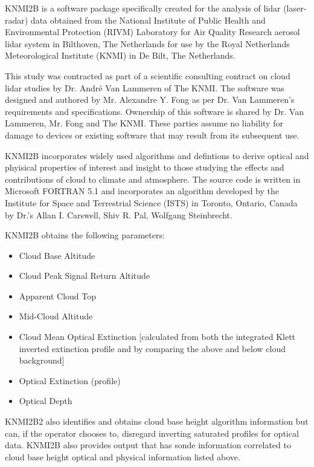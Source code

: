 KNMI2B  is  a software package specifically created for 
the analysis of lidar (laser-radar) data obtained from the National 
Institute of Public Health and Environmental Protection (RIVM)
Laboratory for Air Quality Research aerosol lidar system in 
Bilthoven, The Netherlands for use by the 
Royal Netherlands Meteorological Institute (KNMI) in De Bilt, The Netherlands. 

This study was contracted as part of a scientific consulting contract on
cloud lidar studies by Dr. Andr\'{e} Van Lammeren of  The KNMI. The 
software was designed and authored by 
Mr. Alexandre Y. Fong as per Dr. Van 
Lammeren's requirements and specifications.
Ownership of this software is shared by Dr. Van Lammeren, Mr. Fong 
and The KNMI. These parties assume no liability for damage to devices
or existing software that may result from its subsequent use.

KNMI2B incorporates widely used algorithms and defintions to derive optical
and phyisical properties of interest and insight to those studying the 
effects and contributions of cloud to climate and atmosphere. The source
code is written in Microsoft FORTRAN 5.1 and incorporates an algorithm 
developed by the Institute for Space and Terrestrial Science (ISTS) in 
Toronto, Ontario, Canada by Dr.'s Allan I. Carswell, Shiv R. Pal, 
Wolfgang Steinbrecht.

\noindent
KNMI2B obtains the following parameters:\\

\begin{itemize}
\item Cloud Base Altitude
\item Cloud Peak Signal Return Altitude
\item Apparent Cloud Top
\item Mid-Cloud Altitude
\item Cloud Mean Optical Extinction [calculated from both the integrated
Klett inverted extinction profile and by comparing the above and below 
cloud background]
\item Optical Extinction (profile)
\item Optical Depth
\end{itemize}

KNMI2B2 also identifies and obtains cloud base height 
algorithm information but can, if the operator chooses to,
disregard inverting saturated profiles for optical data.
KNMI2B also provides output that has sonde information correlated to 
cloud base height optical and physical information listed above.


